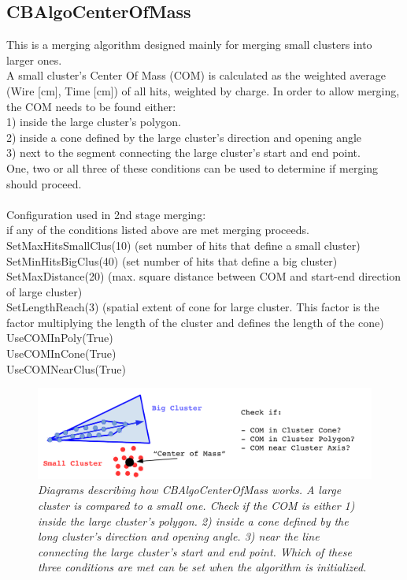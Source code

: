 \documentclass{article}
\begin{document}
\subsection{CBAlgoCenterOfMass}\label{sec:CBAlgoCenterOfMass}
This is a merging algorithm designed mainly for merging small clusters into larger ones.\\
A small cluster's Center Of Mass (COM) is calculated as the weighted average (Wire [cm], Time [cm]) of all hits, weighted
by charge. In order to allow merging, the COM needs to be found either:\\
1) inside the large cluster's polygon.\\
2) inside a cone defined by the large cluster's direction and opening angle\\
3) next to the segment connecting the large cluster's start and end point.\\
One, two or all three of these conditions can be used to determine if merging should proceed.\\
\\
Configuration used in 2nd stage merging:\\
if any of the conditions listed above are met merging proceeds.\\
SetMaxHitsSmallClus(10) (set number of hits that define a small cluster)\\
SetMinHitsBigClus(40) (set number of hits that define a big cluster)\\
SetMaxDistance(20) (max. square distance between COM and start-end direction of large cluster)\\
SetLengthReach(3) (spatial extent of cone for large cluster. This factor is the factor multiplying
the length of the cluster and defines the length of the cone)\\
UseCOMInPoly(True)\\
UseCOMInCone(True)\\
UseCOMNearClus(True)\\
\begin{figure}[h!]
\begin{center}
\includegraphics[width=150mm]{Figures/CBAlgoCenterOfMass.pdf}
\end{center}
\caption{\textit{Diagrams describing how CBAlgoCenterOfMass works. A large cluster is compared to a small one. 
Check if the COM is either 1) inside the large cluster's polygon. 2) inside a cone defined by the
long cluster's direction and opening angle. 3) near the line connecting the large cluster's start and end point.
Which of these three conditions are met can be set when the algorithm is initialized.}}
\label{fig:CBAlgoCenterOfMass}
\end{figure}
\end{document}
